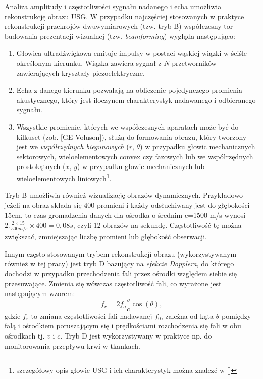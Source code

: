 Analiza amplitudy i częstotliwości sygnału nadanego i echa umożliwia rekonstrukcję obrazu USG. W przypadku najczęściej stosowanych w praktyce rekonstrukcji przekrojów dwuwymiarowych (tzw. tryb B) współczesny tor budowania prezentacji wizualnej (tzw. \textit{beamforming}) wygląda następująco: 
\begin{enumerate}
	\item Głowica ultradźwiękowa emituje impulsy w postaci wąskiej wiązki w ściśle określonym kierunku. Wiązka zawiera sygnał z $N$ przetworników zawierających kryształy piezoelektryczne.
	\item Echa z danego kierunku pozwalają na obliczenie pojedynczego promienia akustycznego, który jest iloczynem charakterystyk nadawanego i odbieranego sygnału.
	\item Wszystkie promienie, których we współczesnych aparatach może być do kilkuset (zob. [GE Voluson]), służą do formowania obrazu, który tworzony jest we \textit{współrzędnych biegunowych} ($r$, $\theta$) w przypadku głowic mechanicznych sektorowych, wieloelementowych convex czy fazowych lub we współrzędnych prostokątnych ($x$, $y$) w przypadku głowic mechanicznych lub wieloelementowych liniowych\footnote{szczegółowy opis głowic USG i ich charakterystyk można znalezć w []}. 
\end{enumerate}

Tryb B umożliwia również wizualizację obrazów dynamicznych. Przykładowo jeżeli na obraz składa się 400 promieni i każdy odsłuchiwany jest do głębokości 15cm, to czas gromadzenia danych dla ośrodka o średnim c=1500 m/s wynosi $2\frac{2\times15}{1500 m/s}\times400 = 0,08 s$, czyli 12 obrazów na sekundę. Częstotliwość tę można zwiększać, zmniejszając liczbę promieni lub głębokość obserwacji.

Innym często stosowanym trybem rekonstrukcji obrazu (wykorzystywanym również w tej pracy) jest tryb D bazujący na \textit{efekcie Dopplera}, do którego dochodzi w przypadku przechodzenia fali przez ośrodki względem siebie się przesuwające. Zmienia się wówczas częstotliwość fali, co wyrażone jest następującym wzorem:
\begin{equation}
f_r = 2 f_o\frac{v}{c}\cos(\theta),
\end{equation} 
gdzie $f_r$ to zmiana częstotliwości fali nadawanej $f_0$, zależna od kąta $\theta$ pomiędzy falą i ośrodkiem poruszającym się i prędkościami rozchodzenia się fali w obu ośrodkach tj. $v$ i $c$. Tryb D jest wykorzystywany w praktyce np. do monitorowania przepływu krwi w tkankach. 


